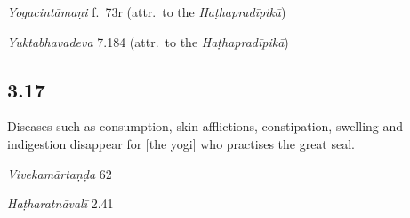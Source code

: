 \begin{ekdosis}
\begin{testimonia}[hp03_016]
\emph{Yogacintāmaṇi} f.~73r (attr.~to the \emph{Haṭhapradīpikā})
\begin{versinnote}
\end{versinnote}

\emph{Yuktabhavadeva} 7.184 (attr.~to the \emph{Haṭhapradīpikā})
\begin{versinnote}
\end{versinnote}
\end{testimonia}


\subsection*{3.17}
\begin{translation}[hp03_017]
Diseases such as consumption, skin afflictions, constipation, swelling and indigestion disappear for [the yogi] who practises the great seal.
\end{translation}

\begin{sources}[hp03_017]
\emph{Vivekamārtaṇḍa} 62
\begin{versinnote}
\tl{\var{tasya doṣāḥ ] sarvarogāḥ \vl, rogās tasya \vl}\\!}
\end{versinnote}
\end{sources}

\begin{testimonia}[hp03_017]
\emph{Haṭharatnāvalī} 2.41
\begin{versinnote}
\end{versinnote}


\end{testimonia}
\end{ekdosis}
